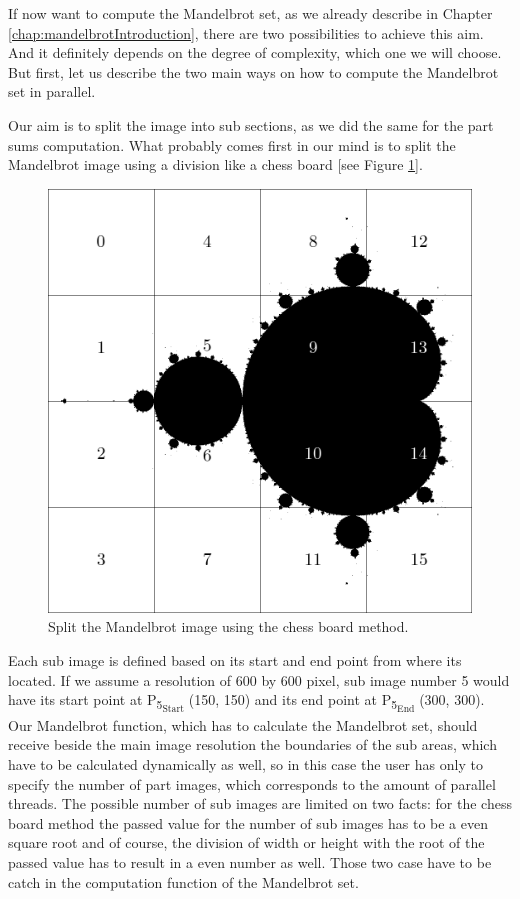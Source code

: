 If now want to compute the Mandelbrot set, as we already describe in Chapter \ref{chap:mandelbrotIntroduction}, there are two possibilities to achieve this aim. And it definitely depends on the degree of complexity, which one we will choose. But first, let us describe the two main ways on how to compute the Mandelbrot set in parallel. 

Our aim is to split the image into sub sections, as we did the same for the part sums computation. What probably comes first in our mind is to split the Mandelbrot image using a division like a chess board [see Figure \ref{fig:mandelbrotChessboard}].

\begin{figure}[htbp]
	\centerline{\includegraphics[width=0.75\linewidth]{images/mandelbrot-chess-board.png}}
	\caption{ Split the Mandelbrot image using the chess board method. }
	\label{fig:mandelbrotChessboard}
\end{figure} 

Each sub image is defined based on its start and end point from where its located. If we assume a resolution of 600 by 600 pixel, sub image number 5 would have its start point at P\textsubscript{5\textsubscript{Start}} (150, 150) and its end point at P\textsubscript{5\textsubscript{End}} (300, 300). Our Mandelbrot function, which has to calculate the Mandelbrot set, should receive beside the main image resolution the boundaries of the sub areas, which have to be calculated dynamically as well, so in this case the user has only to specify the number of part images, which corresponds to the amount of parallel threads. The possible number of sub images are limited on two facts: for the chess board method the passed value for the number of sub images has to be a even square root and of course, the division of width or height with the root of the passed value has to result in a even number as well. Those two case have to be catch in the computation function of the Mandelbrot set.

